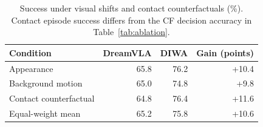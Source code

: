 \begin{table}[t]
\centering
\caption{Success under visual shifts and contact counterfactuals (\%). Contact episode success differs from the CF decision accuracy in Table~\ref{tab:ablation}.}
\label{tab:ood}
\small
\begin{tabular}{lrrr}
\toprule
Condition & DreamVLA & DIWA & Gain (points)\\
\midrule
Appearance & 65.8 & 76.2 & +10.4\\
Background motion & 65.0 & 74.8 & +9.8\\
Contact counterfactual & 64.8 & 76.4 & +11.6\\
Equal-weight mean & 65.2 & 75.8 & +10.6\\
\bottomrule
\end{tabular}
\end{table}
